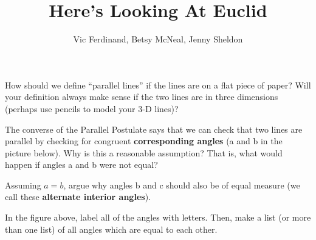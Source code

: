 \documentclass[nooutcomes]{ximera}
\title{Here's Looking At Euclid}
\author{Vic Ferdinand, Betsy McNeal, Jenny Sheldon}
\begin{document}
\begin{abstract}
\end{abstract}

\maketitle





\begin{question}
How should we define ``parallel lines'' if the lines are on a flat piece of paper?  Will your definition always make sense if the two lines are in three dimensions (perhaps use pencils to model your 3-D lines)?
\end{question}









\begin{problem} \label{Euclid1}
The converse of the Parallel Postulate says that we can check that two lines are parallel by checking for congruent {\bf corresponding angles} (a and b in the picture below).  Why is this a reasonable assumption? That is, what would happen if angles a and b were not equal?  

\begin{center}
\end{center}



\end{problem}







\begin{problem}
Assuming $a = b$, argue why angles b and c should also be of equal measure (we call these {\bf alternate interior angles}).
\end{problem}

\begin{problem}
In the figure above, label all of the angles with letters.  Then, make a list (or more than one list) of all angles which are equal to each other.
\end{problem}
\end{document}

